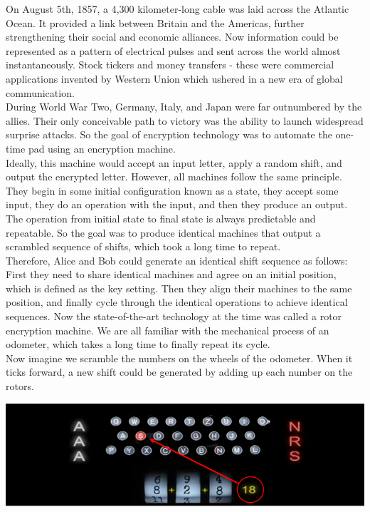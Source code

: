\documentclass{report}
\begin{document}
 On August 5th, 1857, a 4,300 kilometer-long cable was laid across the Atlantic Ocean. It provided a link between Britain and the Americas, further strengthening their social and economic alliances. Now information could be represented as a pattern of electrical pulses and sent across the world almost instantaneously. Stock tickers and money transfers - these were commercial applications invented by Western Union which ushered in a new era of global communication.\\
 During World War Two, Germany, Italy, and Japan were far outnumbered by the allies. Their only conceivable path to victory was the ability to launch widespread surprise attacks. So the goal of encryption technology was to automate the one-time pad using an encryption machine.\\
 Ideally, this machine would accept an input letter, apply a random shift, and output the encrypted letter. However, all machines follow the same principle. \\
 They begin in some initial configuration known as a state, they accept some input, they do an operation with the input, and then they produce an output. The operation from initial state to final state is always predictable and repeatable. So the goal was to produce identical machines that output a scrambled sequence of shifts, which took a long time to repeat.\\ 
 Therefore, Alice and Bob could generate an identical shift sequence as follows: First they need to share identical machines and agree on an initial position, which is defined as the key setting. Then they align their machines to the same position, and finally cycle through the identical operations to achieve identical sequences. Now the state-of-the-art technology at the time was called a rotor encryption machine. We are all familiar with the mechanical process of an odometer, which takes a long time to finally repeat its cycle. \\
 Now imagine we scramble the numbers on the wheels of the odometer. When it ticks forward, a new shift could be generated by adding up each number on the rotors.
 \begin{center}
 	\includegraphics[scale=1]{6.png}
 \end{center}
\end{document}
